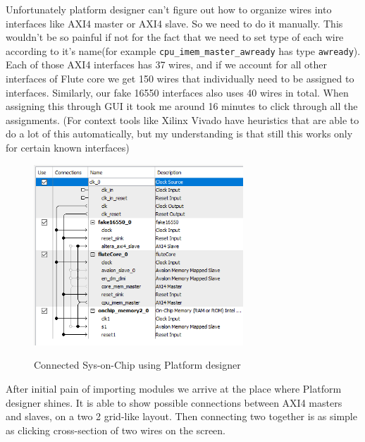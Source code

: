 \documentclass[12pt]{report}
\begin{document}
Unfortunately platform designer can't figure out how to organize wires into interfaces like AXI4 master or AXI4 slave. 
So we need to do it manually. This wouldn't be so painful if not for the fact that we need to set type of each wire according to it's name(for example \verb!cpu_imem_master_awready! has type \verb!awready!). Each of those AXI4 interfaces has 37 wires, and if we account for all other interfaces of Flute core we get 150 wires that individually need to be assigned to interfaces. Similarly, our fake 16550 interfaces also uses 40 wires in total. When assigning this through GUI it took me around 16 minutes to click through all the assignments. (For context tools like Xilinx Vivado have heuristics that are able to do a lot of this automatically, but my understanding is that still this works only for certain known interfaces)
\\
\begin{figure}
    \caption{Connected Sys-on-Chip using Platform designer}
    \includegraphics[width=0.7\textwidth]{images/Example2QSys.png} \\
    \centering
\end{figure}
After initial pain of importing modules we arrive at the place where Platform designer shines. It is able to show possible connections between AXI4 masters and slaves, on a two 2 grid-like layout. Then connecting two together is as simple as clicking cross-section of two wires on the screen.  
\end{document}
